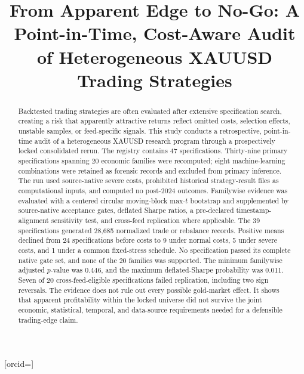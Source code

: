 \documentclass[a4paper,fleqn]{cas-sc}
\begin{document}
\let\WriteBookmarks\relax
\def\floatpagepagefraction{.8}
\def\textpagefraction{.1}

\shortauthors{\AuthorShortName}

\title[mode=title]{From Apparent Edge to No-Go: A Point-in-Time, Cost-Aware Audit of Heterogeneous XAUUSD Trading Strategies}

\author[1]{\AuthorName}[orcid=\AuthorORCID]
\cormark[1]



\begin{abstract}
Backtested trading strategies are often evaluated after extensive specification search, creating a risk that apparently attractive returns reflect omitted costs, selection effects, unstable samples, or feed-specific signals. This study conducts a retrospective, point-in-time audit of a heterogeneous XAUUSD research program through a prospectively locked consolidated rerun. The registry contains 47 specifications. Thirty-nine primary specifications spanning 20 economic families were recomputed; eight machine-learning combinations were retained as forensic records and excluded from primary inference. The run used source-native severe costs, prohibited historical strategy-result files as computational inputs, and computed no post-2024 outcomes. Familywise evidence was evaluated with a centered circular moving-block max-$t$ bootstrap and supplemented by source-native acceptance gates, deflated Sharpe ratios, a pre-declared timestamp-alignment sensitivity test, and cross-feed replication where applicable. The 39 specifications generated 28,685 normalized trade or rebalance records. Positive means declined from 24 specifications before costs to 9 under normal costs, 5 under severe costs, and 1 under a common fixed-stress schedule. No specification passed its complete native gate set, and none of the 20 families was supported. The minimum familywise adjusted $p$-value was 0.446, and the maximum deflated-Sharpe probability was 0.011. Seven of 20 cross-feed-eligible specifications failed replication, including two sign reversals. The evidence does not rule out every possible gold-market effect. It shows that apparent profitability within the locked universe did not survive the joint economic, statistical, temporal, and data-source requirements needed for a defensible trading-edge claim.
\end{abstract}
\end{document}
